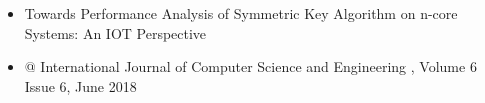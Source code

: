 \documentclass[10pt,a4paper]{altacv}
\begin{document}

\begin{itemize}
\item Towards Performance Analysis of Symmetric Key Algorithm on n-core Systems: An IOT Perspective
\item @ International Journal of Computer Science and Engineering , Volume 6 Issue 6, June 2018 
\end{itemize}




\clearpage
\end{document}
